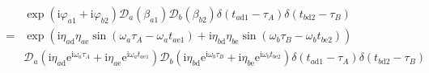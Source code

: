 \documentclass[10pt,fleqn]{article}
\newcommand{\ue}{\mathrm{e}}
\newcommand{\ui}{\mathrm{i}}
\newcommand{\eqar}[1]
{
  \begin{align}
    #1
  \end{align}
}
\newcommand{\paren}[1]{{\left({#1}\right)}}
\begin{document}
\eqar{
  \begin{split}
    &\exp\paren{\ui\varphi_{a1}+\ui\varphi_{b2}}\mathcal{D}_a(\beta_{a1})\mathcal{D}_b(\beta_{b2})\delta(t_{a\mathrm{d}1}-\tau_A)\delta(t_{b\mathrm{d}2}-\tau_B)\\
    =&\exp\paren{
       \ui\eta_{a\mathrm{d}}\eta_{a\mathrm{e}}
       \sin\paren{\omega_a\tau_A-\omega_at_{a\mathrm{e}1}}
       +\ui\eta_{b\mathrm{d}}\eta_{b\mathrm{e}}
       \sin\paren{\omega_b\tau_B-\omega_bt_{b\mathrm{e}2}}}\\
    &\mathcal{D}_a\paren{
      \ui\eta_{a\mathrm{d}}\ue^{\ui\omega_a\tau_A}+\ui\eta_{a\mathrm{e}}\ue^{\ui\omega_at_{a\mathrm{e}1}}
      }
      \mathcal{D}_b\paren{
      \ui\eta_{b\mathrm{d}}\ue^{\ui\omega_b\tau_B}+\ui\eta_{b\mathrm{e}}\ue^{\ui\omega_bt_{b\mathrm{e}2}}
      }
      \delta(t_{a\mathrm{d}1}-\tau_A)\delta(t_{b\mathrm{d}2}-\tau_B)
  \end{split}
}
\end{document}
